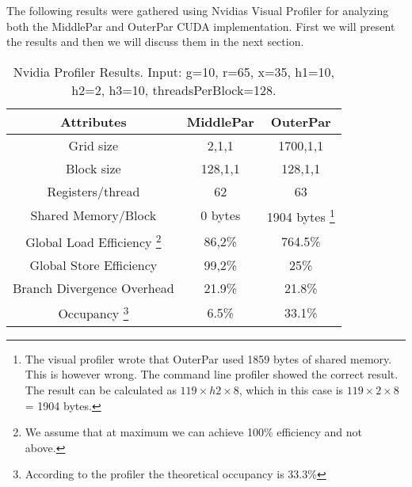 The following results were gathered using Nvidias Visual Profiler for analyzing both the MiddlePar and OuterPar CUDA implementation. First we will present the results and then we will discuss them in the next section.
\begin{savenotes}
\begin{table}  
\begin{center}
\begin{tabular}[t]{|c|c|c|}
	\hline
\textbf{Attributes} & \textbf{MiddlePar} & \textbf{OuterPar} \\\hline
Grid size  & 2,1,1 & 1700,1,1\\\hline
Block size & 128,1,1&128,1,1\\\hline
Registers/thread & 62&63\\\hline
Shared Memory/Block &0 bytes& 1904 bytes \footnote{The visual profiler wrote that OuterPar used 1859 bytes of shared memory. This is however wrong. The command line profiler showed the correct result. The result can be calculated as $119 \times h2 \times 8$, which in this case is $119 \times 2 \times8$ = 1904 bytes.}\\\hline
Global Load Efficiency \footnote{We assume that at maximum we can achieve 100\% efficiency and not above.}&86,2\%&764.5\%\\\hline
Global Store Efficiency&99,2\%&25\%\\\hline
Branch Divergence Overhead&21.9\%& 21.8\%\\\hline
Occupancy \footnote{According to the profiler the theoretical occupancy is 33.3\%}&6.5\%&33.1\%\\\hline
\end{tabular}
\end{center}
\caption{Nvidia Profiler Results. Input: g=10, r=65, x=35, h1=10, h2=2, h3=10, threadsPerBlock=128.}
\label{table:profiler}
\end{table}
\end{savenotes}

